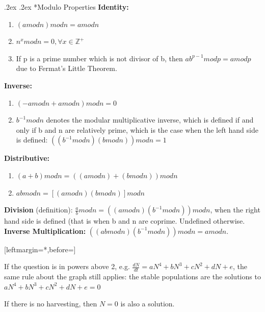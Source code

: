 \documentclass[10pt,landscape,a4paper]{article}
\makeatletter
\newenvironment{descitemize} %
{\begin{description}[leftmargin=*,before=\let\makelabel\descitemlabel]}
{\end{description}}
\newcommand{\descitemlabel}[1]{%
\textbullet\ \textbf{#1}%
}
\renewcommand{\section}{\@startsection{section}{1}{0mm}%
                                {.2ex}%
                                {.2ex}%
                                {\color{myblue}\sffamily\small\bfseries}}
\makeatother
\begin{document}
\begin{multicols*}{4}
\section*{Modulo Properties}
  \textbf{Identity:}
  \begin{enumerate}
    \item \((a mod n)modn = a mod n\)
    \item \( n^x mod n = 0, \forall x \in \mathbb{Z}^+ \)
    \item If p is a prime number which is not divisor of b, then \(ab^{p - 1} mod p = a mod p \) due to Fermat's Little Theorem.
  \end{enumerate}
  \textbf{Inverse:}
  \begin{enumerate}
    \item \( (-a mod n + a mod n) mod n = 0 \)
    \item \( b^{-1} mod n \) denotes the modular multiplicative inverse, which is defined if and only if b and n are relatively prime, which is the case when the left hand side is defined: \( ((b^{-1} mod n)(b mod n)) mod n = 1 \)
  \end{enumerate}
  \textbf{Distributive:}
  \begin{enumerate}
    \item \( (a + b) mod n = ((a mod n) + (b mod n)) mod n \)
    \item \( ab mod n = [(a mod n)(b mod n)] mod n \)
  \end{enumerate}
  \textbf{Division} (definition): \( \frac{a}{b}mod n = ((a mod n)(b^{−1} mod n))modn \), when the right hand side is defined (that is when b and n are coprime. Undefined otherwise.  \\
  \textbf{Inverse Multiplication:} \(  ((ab mod n)(b^{-1} mod n)) mod n = a mod n. \)
  \begin{descitemize}
    \item If the question is in powers above 2, e.g. $\frac{dN}{dt}=aN^4+bN^3+cN^2+dN+e$, the same rule about the graph still applies: the stable populations are the solutions to $aN^4+bN^3+cN^2+dN+e=0$
    \item If there is no harvesting, then $N=0$ is also a solution.
  \end{descitemize}
\end{multicols*}
\end{document}
